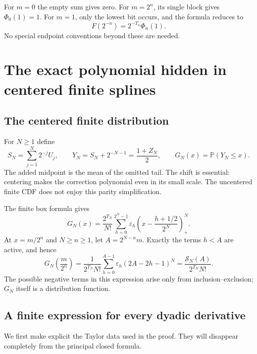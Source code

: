 \documentclass[11pt,a4paper]{article}
\numberwithin{equation}{section}
\theoremstyle{definition}
\theoremstyle{remark}
\newcommand{\Pp}{\mathbb P}
\newcommand{\eps}{\varepsilon}
\newcommand{\pos}[1]{\left(#1\right)_+}
\begin{document}
For $m=0$ the empty sum gives zero. For $m=2^n$, its single block gives $\Phi_0(1)=1$. For $m=1$, only the lowest bit occurs, and the formula reduces to
\begin{equation}
 F(2^{-n})=2^{-T_n}\Phi_n(1).
 \label{eq:smallest-dyadic}
\end{equation}
No special endpoint conventions beyond these are needed.

\section{The exact polynomial hidden in centered finite splines}
\label{sec:local-splines}

\subsection{The centered finite distribution}
For $N\ge1$ define
\begin{equation}
 S_N=\sum_{j=1}^{N}2^{-j}U_j,
 \qquad Y_N=S_N+2^{-N-1}=\frac{1+Z_N}{2},
 \qquad G_N(x)=\Pp(Y_N\le x).
 \label{eq:centered-prefix}
\end{equation}
The added midpoint is the mean of the omitted tail. The shift is essential: centering makes the correction polynomial even in its small scale. The uncentered finite CDF does not enjoy this parity simplification.

The finite box formula gives
\begin{equation}
 G_N(x)=\frac{2^{T_N}}{N!}
   \sum_{h=0}^{2^N-1}\eps_h
       \pos{x-\frac{h+1/2}{2^N}}^N.
 \label{eq:G-positive-parts}
\end{equation}
At $x=m/2^n$ and $N\ge n\ge1$, let $A=2^{N-n}m$. Exactly the terms $h<A$ are active, and hence
\begin{equation}
 \boxed{\displaystyle
 G_N\!\left(\frac m{2^n}\right)
 =\frac{1}{2^{T_N}N!}
   \sum_{h=0}^{A-1}\eps_h(2A-2h-1)^N
 =\frac{\mathcal S_N(A)}{2^{T_N}N!}.}
 \label{eq:G-integer-sum}
\end{equation}
The possible negative terms in this expression arise only from inclusion--exclusion; $G_N$ itself is a distribution function.

\subsection{A finite expression for every dyadic derivative}
We first make explicit the Taylor data used in the proof. They will disappear completely from the principal closed formula.
\end{document}
